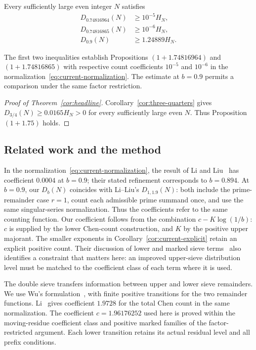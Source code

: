 \begin{corollary}
\label{cor:current-explicit}
Every sufficiently large even integer $N$ satisfies
\begin{align}
 D_{0.74816964}(N)&\ge10^{-5}H_N,
                                  \label{eq:current-main-count}\\
 D_{0.74816865}(N)&\ge10^{-6}H_N,
                                  \label{eq:current-secondary-count}\\
 D_{0.9}(N)&\ge1.24889H_N.
                                  \label{eq:current-common-exponent}
\end{align}
\end{corollary}

The first two inequalities establish Propositions $(1+1.74816964)$
and $(1+1.74816865)$ with respective count coefficients $10^{-5}$ and
$10^{-6}$ in the normalization~\eqref{eq:current-normalization}.
The estimate at $b=0.9$ permits a comparison under the same factor
restriction.

\begin{proof}[Proof of Theorem~\ref{cor:headline}]
Corollary~\ref{cor:three-quarters} gives $D_{3/4}(N)\ge0.0165H_N>0$
for every sufficiently large even $N$. Thus Proposition $(1+1.75)$ holds.
\end{proof}

\subsection{Related work and the method}
In the normalization~\eqref{eq:current-normalization}, the result of
Li and Liu~\cite[Theorem~1.1]{LiLiu} has coefficient $0.0004$ at
$b=0.9$; their stated refinement corresponds to $b=0.894$.
At $b=0.9$, our $D_b(N)$ coincides with Li--Liu's $D_{1,1.9}(N)$:
both include the prime-remainder case $r=1$, count each admissible
prime summand once, and use the same singular-series normalization.
Thus the coefficients refer to the same counting function.
Our coefficient follows from the combination $c-K\log(1/b)$: $c$ is
supplied by the lower Chen-count construction, and $K$ by the positive
upper majorant.
The smaller exponents in Corollary~\ref{cor:current-explicit} retain
an explicit positive count. Their discussion of lower and marked sieve
terms~\cite[Sections~3 and 8.2]{LiLiu} also identifies a constraint
that matters here: an improved upper-sieve distribution level must be
matched to the coefficient class of each term where it is used.

The double sieve transfers information between upper and lower sieve
remainders. We use Wu's formulation~\cite{Wu}, with finite positive
transitions for the two remainder functions.
Li~\cite[Theorem~1.1]{RunboLi} gives coefficient $1.9728$ for the total
Chen count in the same normalization. The coefficient $c=1.96176252$
used here is proved within the moving-residue coefficient class and
positive marked families of the factor-restricted argument. Each lower
transition retains its actual residual level and all prefix conditions.

